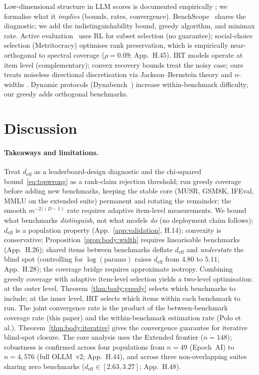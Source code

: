 \documentclass{article}
\begin{document}
Low-dimensional structure in LLM scores is documented empirically
\citep{burnell2024revealing, kipnis2025metabench,
hernandezorallo2026nature}; we formalise what it \emph{implies}
(bounds, rates, convergence).
BenchScope~\citep{shazhao2026benchscope} shares the diagnostic; we
add the indistinguishability bound, greedy algorithm, and minimax
rate. Active evaluation~\citep{li2025active} uses RL for subset
selection (no guarantee); social-choice selection (Metritocracy)
optimises rank preservation, which is empirically near-orthogonal
to spectral coverage ($\rho = 0.09$; App.~H.45).
IRT models \citep{polo2024tinybenchmarks} operate at item level
(complementary); convex recovery bounds
\citep{guntuboyina2011minimax} treat the noisy case; ours treats
noiseless directional discretisation via Jackson--Bernstein theory
\citep{ragozin1970polynomial} and $n$-widths
\citep{magaril2006optimal}. Dynamic protocols
(Dynabench~\citep{kiela2021dynabench}) increase within-benchmark
difficulty; our greedy adds orthogonal benchmarks.

\section{Discussion}
\label{sec:discuss}
\label{sec:discuss}

\paragraph{Takeaways and limitations.}
Treat $d_{\mathrm{eff}}$ as a leaderboard-design diagnostic and the
chi-squared bound~\eqref{eq:topwrong} as a rank-claim rejection
threshold; run greedy coverage before adding new benchmarks, keeping
the stable core (MUSR, GSM8K, IFEval, MMLU on the extended suite)
permanent and rotating the remainder; the smooth $m^{-2/(D-1)}$ rate
requires adaptive item-level measurements. We bound what benchmarks
\emph{distinguish}, not what models \emph{do} (no deployment claim
follows); $d_{\mathrm{eff}}$ is a population property
(App.~\ref{app:validation}, H.14); convexity is conservative;
Proposition~\ref{prop:body:width} requires linearisable benchmarks
(App.~H.26); shared items between benchmarks deflate
$d_{\mathrm{eff}}$ and \emph{understate} the blind spot (controlling
for $\log(\mathrm{params})$ raises $d_{\mathrm{eff}}$ from $4.80$ to
$5.11$; App.~H.28); the coverage bridge requires approximate isotropy.
Combining greedy coverage with adaptive item-level selection
\citep{polo2024tinybenchmarks} yields a two-level optimisation: at the
outer level, Theorem~\ref{thm:body:greedy} selects which benchmarks to
include; at the inner level, IRT selects which items within each
benchmark to run. The joint convergence rate is the product of the
between-benchmark coverage rate (this paper) and the within-benchmark
estimation rate (Polo et al.).
Theorem~\ref{thm:body:iterative} gives the convergence guarantee for
iterative blind-spot closure. The core analysis uses the Extended
frontier ($n = 148$); robustness is confirmed across four
populations from $n = 49$ (Epoch~AI) to $n = 4{,}576$ (full OLLM~v2;
App.~H.44), and across three non-overlapping suites sharing zero
benchmarks ($d_{\mathrm{eff}} \in [2.63, 3.27]$; App.~H.48).
\end{document}
